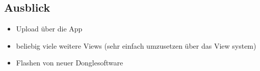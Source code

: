 \subsection{Ausblick}

\begin{itemize}
\item Upload über die App
\item beliebig viele weitere Views (sehr einfach umzusetzen über das View system)
\item Flashen von neuer Donglesoftware
\end{itemize}
  

 
 
 
 
 
 
 
 